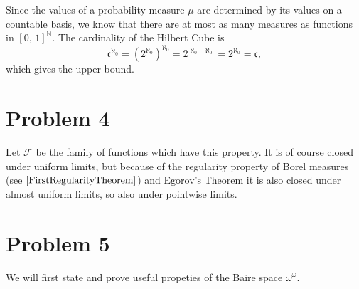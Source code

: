Since the values of a probability measure \( \mu \) are determined by its values on a countable basis, we know that there are at most as many measures as functions in \( [0,\,1]^{ \mathbb{N} } \). The cardinality of the Hilbert Cube is
\[ 
    \mathfrak{c}^{\aleph_0} = \left( 2^{\aleph_0} \right)^{\aleph_0} = 2^{\aleph_0 \cdot \aleph_0} = 2^{\aleph_0} = \mathfrak{c}, 
\]
which gives the upper bound.

\section*{Problem 4}

Let \( \mathcal{F} \) be the family of functions which have this property. It is of course closed under uniform limits, but because of the regularity property of Borel measures (see \( \ref{FirstRegularityTheorem} \)) and Egorov's Theorem it is also closed under almost uniform limits, so also under pointwise limits.

\section*{Problem 5}

We will first state and prove useful propeties of the Baire space \( \omega^\omega \).

